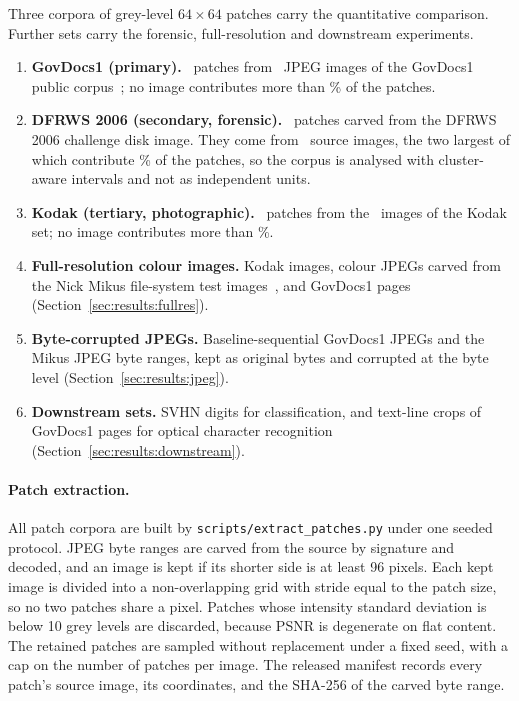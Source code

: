 \documentclass[final,3p]{elsarticle}
\begin{document}
Three corpora of grey-level $64 \times 64$ patches carry the quantitative comparison. Further sets carry the forensic, full-resolution and downstream experiments.
\begin{enumerate}
  \item \textbf{GovDocs1 (primary).} \corpusGovN\ patches from \corpusGovImages\ JPEG images of the GovDocs1 public corpus~\cite{garfinkel2009bringing}; no image contributes more than \corpusGovMaxShare\% of the patches.
  \item \textbf{DFRWS 2006 (secondary, forensic).} \corpusDfrwsN\ patches carved from the DFRWS 2006 challenge disk image. They come from \corpusDfrwsImages\ source images, the two largest of which contribute \corpusDfrwsTopTwoShare\% of the patches, so the corpus is analysed with cluster-aware intervals and not as independent units.
  \item \textbf{Kodak (tertiary, photographic).} \corpusKodakN\ patches from the \corpusKodakImages\ images of the Kodak set; no image contributes more than \corpusKodakMaxShare\%.
  \item \textbf{Full-resolution colour images.} Kodak images, colour JPEGs carved from the Nick Mikus file-system test images~\cite{mikus2005evaluation}, and GovDocs1 pages (Section~\ref{sec:results:fullres}).
  \item \textbf{Byte-corrupted JPEGs.} Baseline-sequential GovDocs1 JPEGs and the Mikus JPEG byte ranges, kept as original bytes and corrupted at the byte level (Section~\ref{sec:results:jpeg}).
  \item \textbf{Downstream sets.} SVHN digits for classification, and text-line crops of GovDocs1 pages for optical character recognition (Section~\ref{sec:results:downstream}).
\end{enumerate}

\paragraph{Patch extraction.} All patch corpora are built by \texttt{scripts/\allowbreak extract\allowbreak\_patches.py} under one seeded protocol. JPEG byte ranges are carved from the source by signature and decoded, and an image is kept if its shorter side is at least 96 pixels. Each kept image is divided into a non-overlapping grid with stride equal to the patch size, so no two patches share a pixel. Patches whose intensity standard deviation is below 10 grey levels are discarded, because PSNR is degenerate on flat content. The retained patches are sampled without replacement under a fixed seed, with a cap on the number of patches per image. The released manifest records every patch's source image, its coordinates, and the SHA-256 of the carved byte range.
\end{document}
